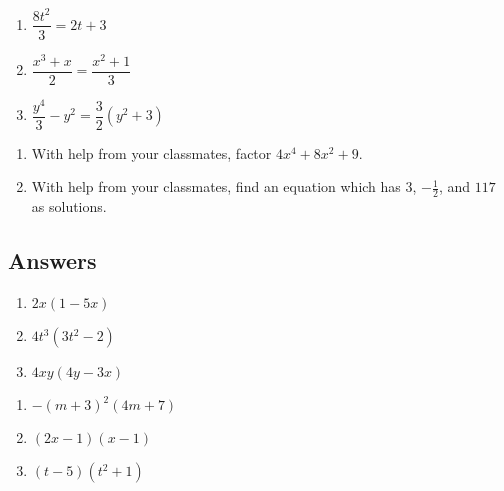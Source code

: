 \documentclass[11pt]{article}
\theoremstyle{definition}  %
\newcounter{HW}
\begin{document}
\begin{multicols}{3}
\begin{enumerate}
\setcounter{enumi}{\value{HW}}

\item $\dfrac{8t^2}{3} = 2t+3$
\item $\dfrac{x^3+x}{2} = \dfrac{x^2+1}{3}$
\item $\dfrac{y^4}{3} - y^2 = \dfrac{3}{2} (y^2 + 3)$ \label{solvebyfactorlast}

\setcounter{HW}{\value{enumi}}
\end{enumerate}
\end{multicols}

\begin{enumerate}
\setcounter{enumi}{\value{HW}}

\item  With help from your classmates, factor $4x^4 + 8x^2 + 9$.  

\item  With help from your classmates, find an equation which has $3$, $-\frac{1}{2}$, and $117$ as solutions.  

\setcounter{HW}{\value{enumi}}
\end{enumerate}

\newpage

\subsection{Answers}

\begin{multicols}{3}
\begin{enumerate}

\item $2x(1 - 5x)$ 
\item $4t^3(3t^2-2)$
\item $4xy(4y-3x)$

\setcounter{HW}{\value{enumi}}
\end{enumerate}
\end{multicols}

\begin{multicols}{3}
\begin{enumerate}
\setcounter{enumi}{\value{HW}}

\item $-(m+3)^2(4m+7)$
\item $(2x-1)(x-1)$
\item $(t-5)(t^2+1)$

\setcounter{HW}{\value{enumi}}
\end{enumerate}
\end{multicols}
\end{document}
